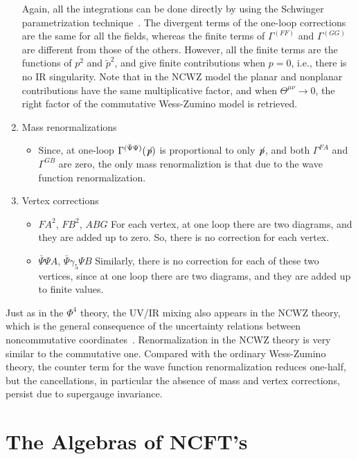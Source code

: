 \documentclass[a4paper,a4paper]{article}
\begin{document}
\begin{enumerate}
Again, all the integrations can be done directly by using the Schwinger 
parametrization technique~\cite{IZu,Hayakawa}. The divergent terms of the one-loop 
corrections are the same for all the fields, whereas the finite terms of $\Gamma^{(FF)}$ 
and $\Gamma^{(GG)}$ are different from those of the others. However, all the finite terms 
are the functions of $p^2$ and $\tilde{p}^2$, and give finite contributions when $p =0$, 
i.e., there is no IR singularity. Note that in the NCWZ model the planar and 
nonplanar contributions have the same multiplicative factor, 
and when $\Theta^{\mu\nu}\rightarrow 0$, the right factor 
of the commutative Wess-Zumino model is retrieved. 


\item Mass renormalizations
\begin{itemize}
\item Since, at one-loop $\Gamma^{(\bar{\Psi}\Psi)}(\not\negthinspace p)$ is proportional to 
only $\not\negthinspace p$, and both $\Gamma^{FA}$ and $\Gamma^{GB}$ are zero, the 
only mass renormaliztion is that due to the wave function renormalization. 
\end{itemize}
\item Vertex corrections
\begin{itemize}
\item $FA^2$, $FB^2$, $ABG$\newline
For each vertex, at one loop there are two diagrams, and they are added up to zero. So,
there is no correction for each vertex.
\item $\bar{\Psi} \Psi A$, 
$\bar{\Psi} \gamma_5 \Psi B$ \newline  
Similarly, there is no correction for each of these two vertices, since at one loop there 
are two diagrams, and they are added up to finite values.
\end{itemize}
\end{enumerate}

Just as in the $\Phi^4$ theory, the UV/IR mixing also appears in the NCWZ theory, 
which is the general consequence of 
the uncertainty relations between noncommutative coordinates~\cite{SW}. 
Renormalization in the NCWZ theory is very similar
to the commutative one. Compared with the ordinary
Wess-Zumino theory, the counter term for the wave function renormalization
reduces one-half, but the cancellations, in particular the absence
of mass and vertex corrections, persist due to supergauge invariance. 

\section{The Algebras of NCFT's}
\end{document}
